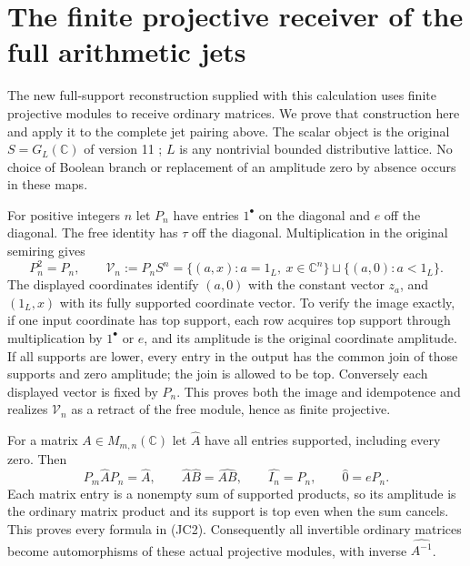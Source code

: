 \section{The finite projective receiver of the full arithmetic jets}
\label{sec:projective-jet-receiver}

The new full-support reconstruction supplied with this calculation uses
finite projective modules to receive ordinary matrices. We prove that
construction here and apply it to the complete jet pairing above.
The scalar object is the original $S=G_L(\mathbb C)$ of version 11
\cite{support}; $L$ is any nontrivial bounded distributive lattice.
No choice of Boolean branch or replacement of an amplitude zero by
absence occurs in these maps.

For positive integers $n$ let $P_n$ have entries $1^\bullet$ on
the diagonal and $e$ off the diagonal. The free identity has $\tau$
off the diagonal. Multiplication in the original semiring gives
\[
 P_n^2=P_n,\qquad
 \mathcal V_n:=P_nS^n
 =\{(a,x):a=1_L,\ x\in\mathbb C^n\}
       \sqcup\{(a,0):a<1_L\}.
 \tag{JC1}
\]
The displayed coordinates identify $(a,0)$ with the constant vector
$z_a$, and $(1_L,x)$ with its fully supported coordinate vector.
To verify the image exactly, if one input coordinate has top support,
each row acquires top support through multiplication by $1^\bullet$
or $e$, and its amplitude is the original coordinate amplitude.
If all supports are lower, every entry in the output has the common
join of those supports and zero amplitude; the join is allowed to
be top. Conversely each displayed vector is fixed by $P_n$.
This proves both the image and idempotence and realizes $\mathcal V_n$
as a retract of the free module, hence as finite projective.

For a matrix $A\in M_{m,n}(\mathbb C)$ let $\widehat A$ have
all entries supported, including every zero. Then
\[
 P_m\widehat A P_n=\widehat A,\qquad
 \widehat A\widehat B=\widehat{AB},\qquad
 \widehat {I_n}=P_n,\qquad \widehat 0=eP_n.
 \tag{JC2}
\]
Each matrix entry is a nonempty sum of supported products, so its
amplitude is the ordinary matrix product and its support is top even
when the sum cancels. This proves every formula in (JC2).
Consequently all invertible ordinary matrices become automorphisms
of these actual projective modules, with inverse $\widehat{A^{-1}}$.

